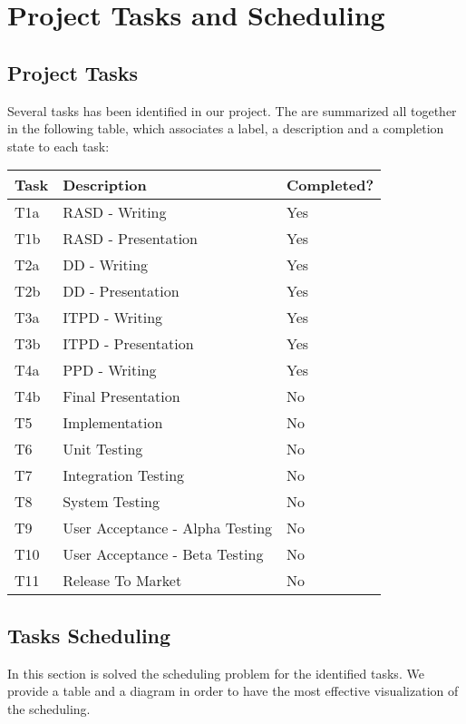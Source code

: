 \section{Project Tasks and Scheduling}
%
\subsection{Project Tasks}
Several tasks has been identified in our project.
The are summarized all together in the following table, which associates a label, a description and a completion state to each task:
\begin{center}
	\begin{tabulary}{\linewidth\tymin=70pt}{Y{2cm}|Y{6cm}|Y{2.25cm}}
		\textbf{Task} & \textbf{Description} & \textbf{Completed?}\\ \hline
		T1a & RASD - Writing & Yes \\ \hline
		T1b & RASD - Presentation & Yes \\ \hline
		T2a & DD - Writing & Yes \\ \hline
		T2b & DD - Presentation & Yes \\ \hline
		T3a & ITPD - Writing & Yes \\ \hline
		T3b & ITPD - Presentation & Yes \\ \hline
		T4a & PPD - Writing & Yes \\ \hline
		T4b & Final Presentation & No \\ \hline
		T5 & Implementation & No \\ \hline
		T6 & Unit Testing & No \\ \hline
		T7 & Integration Testing & No \\ \hline
		T8 & System Testing & No \\ \hline
		T9 & User Acceptance - Alpha Testing & No \\ \hline
		T10 & User Acceptance - Beta Testing & No \\ \hline
		T11 & Release To Market & No \\
	\end{tabulary}
\end{center}
%
\subsection{Tasks Scheduling}
In this section is solved the scheduling problem for the identified tasks.
We provide a table and a diagram in order to have the most effective visualization of the scheduling.
%

